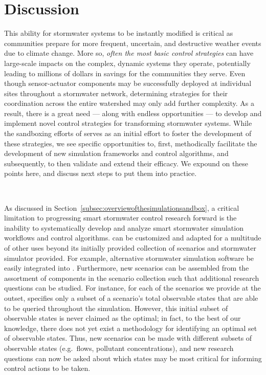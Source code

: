 \section{Discussion}
\label{sec:discussion}
%
%
%
This ability for stormwater systems to be instantly modified is critical as communities prepare for more frequent, uncertain, and destructive weather events due to climate change. More so, \emph{often the most basic control strategies} can have large-scale impacts on the complex, dynamic systems they operate, potentially leading to millions of dollars in savings for the communities they serve. Even though sensor-actuator components may be successfully deployed at individual sites throughout a stormwater network, determining strategies for their coordination across the entire watershed may only add further complexity. As a result, there is a great need --- along with endless opportunities --- to develop and implement novel control strategies for transforming stormwater systems. While the sandboxing efforts of \pystorms serves as an initial effort to foster the development of these strategies, we see specific opportunities to, first, methodically facilitate the development of new simulation frameworks and control algorithms, and subsequently, to then validate and extend their efficacy. We expound on these points here, and discuss next steps to put them into practice.

\

As discussed in Section~\ref{subsec:overviewofthesimulationsandbox}, a critical limitation to progressing smart stormwater control research forward is the inability to systematically develop and analyze smart stormwater simulation workflows and control algorithms. \pystorms can be customized and adapted for a multitude of other uses beyond its initially provided collection of scenarios and stormwater simulator provided. For example, alternative stormwater simulation software be easily integrated into \pystormsNOSPACE.  Furthermore, new scenarios can be assembled from the assortment of components in the scenario collection such that additional research questions can be studied. For instance, for each of the scenarios we provide at the outset, \pystorms specifies only a subset of a scenario's total observable states that are able to be queried throughout the simulation.
However, this initial subset of observable states is never claimed as the optimal; in fact, to the best of our knowledge, there does not yet exist a methodology for identifying an optimal set of observable states. Thus, new scenarios can be made with different subsets of observable states (e.g.\ flows, pollutant concentrations), and new research questions can now be asked about which states may be most critical for informing control actions to be taken.

